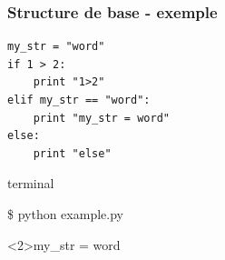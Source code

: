 \begin{frame}[fragile]
  \frametitle{Structure de base - exemple}
  \begin{lstlisting}
my_str = "word"
if 1 > 2:
    print "1>2"
elif my_str == "word":
    print "my_str = word"
else:
    print "else"
  \end{lstlisting}

  \begin{beamercolorbox}{terminal}
  \begin{semiverbatim}
 \$ python example.py
 \begin{uncoverenv}<2>my_str = word\end{uncoverenv}
  \end{semiverbatim}
  \end{beamercolorbox}

\end{frame}


